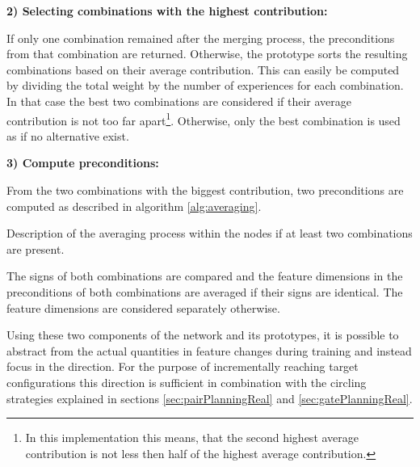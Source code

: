 \textbf{2) Selecting combinations with the highest contribution:}

If only one combination remained after the merging process, the preconditions from that combination are returned. 
Otherwise, the prototype sorts the resulting combinations based on their average contribution. This can easily be computed by dividing the total weight by the number of experiences for each combination.
In that case the best two combinations are considered if their average contribution is not too far apart\footnote{In this implementation this means, that the second highest average contribution is not less then half of the highest average contribution.}. Otherwise, only the best combination is used as if no alternative exist.

\textbf{3) Compute preconditions:}

From the two combinations with the biggest contribution, two preconditions are computed as described in algorithm \ref{alg:averaging}.

\begin{algorithm}[h]
\begin{algorithmic}[1]
	\Statex
		\Else
		\EndIf
	\EndFor
\end{algorithmic}
\caption{Description of the averaging process within the nodes if at least two combinations are present.}
\label{alg:averaging}
\end{algorithm}

The signs of both combinations are compared and the feature dimensions in the preconditions of both combinations are averaged if their signs are identical.
The feature dimensions are considered separately otherwise.

Using these two components of the network and its prototypes, it is possible to abstract from the actual quantities in feature changes during training and instead focus in the direction. For the purpose of incrementally reaching target configurations this direction is sufficient in combination with the circling strategies explained in sections \ref{sec:pairPlanningReal} and \ref{sec:gatePlanningReal}.


